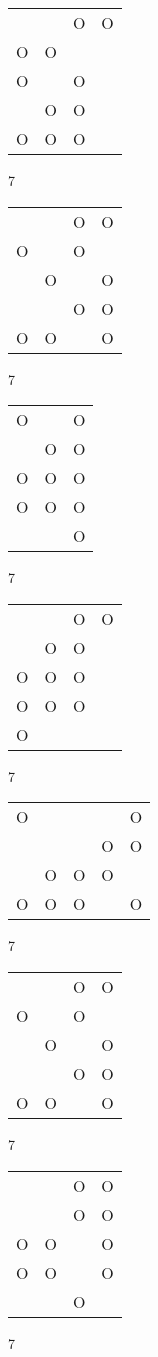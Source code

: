 \begin{tabular}{|m{0.2cm}m{0.2cm}m{0.2cm}m{0.2cm}|}\hline
 & &O&O\\
O&O& & \\
O& &O& \\
 &O&O& \\
O&O&O& \\
\hline\end{tabular}7
\begin{tabular}{|m{0.2cm}m{0.2cm}m{0.2cm}m{0.2cm}|}\hline
 & &O&O\\
O& &O& \\
 &O& &O\\
 & &O&O\\
O&O& &O\\
\hline\end{tabular}7
\begin{tabular}{|m{0.2cm}m{0.2cm}m{0.2cm}|}\hline
O& &O\\
 &O&O\\
O&O&O\\
O&O&O\\
 & &O\\
\hline\end{tabular}7
\begin{tabular}{|m{0.2cm}m{0.2cm}m{0.2cm}m{0.2cm}|}\hline
 & &O&O\\
 &O&O& \\
O&O&O& \\
O&O&O& \\
O& & & \\
\hline\end{tabular}7
\begin{tabular}{|m{0.2cm}m{0.2cm}m{0.2cm}m{0.2cm}m{0.2cm}|}\hline
O& & & &O\\
 & & &O&O\\
 &O&O&O& \\
O&O&O& &O\\
\hline\end{tabular}7
\begin{tabular}{|m{0.2cm}m{0.2cm}m{0.2cm}m{0.2cm}|}\hline
 & &O&O\\
O& &O& \\
 &O& &O\\
 & &O&O\\
O&O& &O\\
\hline\end{tabular}7
\begin{tabular}{|m{0.2cm}m{0.2cm}m{0.2cm}m{0.2cm}|}\hline
 & &O&O\\
 & &O&O\\
O&O& &O\\
O&O& &O\\
 & &O& \\
\hline\end{tabular}7
